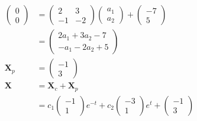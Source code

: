 \documentclass{article}
\begin{document}
\begin{align*}
\begin{pmatrix}
    0 \\
    0
  \end{pmatrix} & = \begin{pmatrix}
                      2  & 3  \\
                      -1 & -2
                    \end{pmatrix} \begin{pmatrix}
                                    a_1 \\
                                    a_2
                                  \end{pmatrix} + \begin{pmatrix}
                                                    -7 \\
                                                    5
                                                  \end{pmatrix}                        \\
                  & = \begin{pmatrix}
                        2 a_1 + 3 a_2 - 7 \\
                        -a_1 - 2 a_2 + 5
                      \end{pmatrix}                                                 \\
  \mathbf{X}_p    & = \begin{pmatrix}
                        -1 \\
                        3
                      \end{pmatrix}                                                    \\
  \mathbf{X}      & = \mathbf{X}_c + \mathbf{X}_p                                       \\
                  & = c_1 \begin{pmatrix}
                            -1 \\
                            1
                          \end{pmatrix} e^{-t} + c_2 \begin{pmatrix}
                                                       -3 \\
                                                       1
                                                     \end{pmatrix} e^t + \begin{pmatrix}
                                                                           -1 \\
                                                                           3
                                                                         \end{pmatrix} \\
\end{align*}
\end{document}
